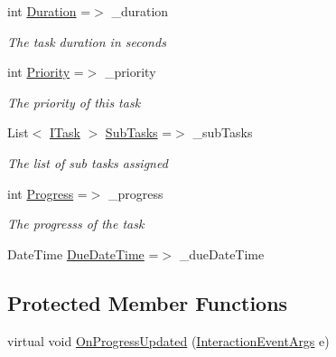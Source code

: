 \begin{DoxyCompactItemize}
int \hyperlink{class_plex_byte_1_1_mo_cap_1_1_interactions_1_1_task_a84a9a89d90c83269366f70ea3e6cc2b9}{Duration} =$>$ \+\_\+duration
\begin{DoxyCompactList}\small\item\em The task duration in seconds \end{DoxyCompactList}\item 
int \hyperlink{class_plex_byte_1_1_mo_cap_1_1_interactions_1_1_task_a4b3325d26ed2025dd44f597a428cfdd0}{Priority} =$>$ \+\_\+priority
\begin{DoxyCompactList}\small\item\em The priority of this task \end{DoxyCompactList}\item 
List$<$ \hyperlink{interface_plex_byte_1_1_mo_cap_1_1_interactions_1_1_i_task}{I\+Task} $>$ \hyperlink{class_plex_byte_1_1_mo_cap_1_1_interactions_1_1_task_adc2d20b794d9621f0f9496d753376a92}{Sub\+Tasks} =$>$ \+\_\+sub\+Tasks
\begin{DoxyCompactList}\small\item\em The list of sub tasks assigned \end{DoxyCompactList}\item 
int \hyperlink{class_plex_byte_1_1_mo_cap_1_1_interactions_1_1_task_a557416cee8b3425c49f40fc07435719e}{Progress} =$>$ \+\_\+progress
\begin{DoxyCompactList}\small\item\em The progresss of the task \end{DoxyCompactList}\item 
Date\+Time \hyperlink{class_plex_byte_1_1_mo_cap_1_1_interactions_1_1_task_ad232b867da717b3f823363d627b24009}{Due\+Date\+Time} =$>$ \+\_\+due\+Date\+Time
\end{DoxyCompactItemize}
\subsection*{Protected Member Functions}
\begin{DoxyCompactItemize}
\item 
virtual void \hyperlink{class_plex_byte_1_1_mo_cap_1_1_interactions_1_1_task_a9784fcd7276f0b4111d7a7f8ef64e34e}{On\+Progress\+Updated} (\hyperlink{class_plex_byte_1_1_mo_cap_1_1_interactions_1_1_interaction_event_args}{Interaction\+Event\+Args} e)
\end{DoxyCompactItemize}
